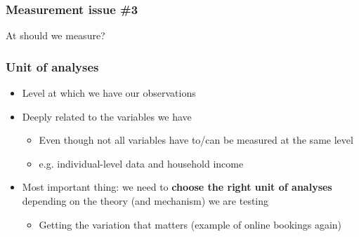 \documentclass[aspectratio=43]{beamer}
\begin{document}
\begin{frame}
\frametitle{Measurement issue \#3}
\centering

At  should we measure?

\end{frame}

\begin{frame}
\frametitle{Unit of analyses}
\centering

\begin{itemize}
  \item Level at which we have our observations
  \item Deeply related to the variables we have
  \begin{itemize}
    \item Even though not all variables have to/can be measured at the same level
    \item<2-> e.g. individual-level data and household income
  \end{itemize}
  \item<3-> Most important thing: we need to \textbf{choose the right unit of analyses} depending on the theory (and mechanism) we are testing
  \begin{itemize}
    \item Getting the variation that matters (example of online bookings again)
  \end{itemize}
\end{itemize}


\end{frame}




\end{document}
